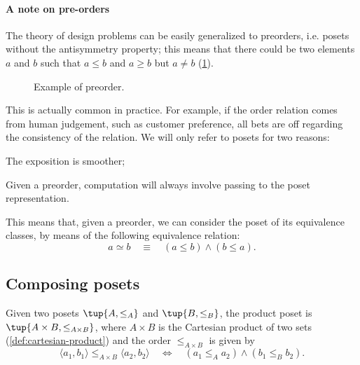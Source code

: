 \paragraph{A note on pre-orders}
The theory of design problems can be easily generalized to preorders, i.e. posets without the antisymmetry property; this means that there could be two elements $a$ and $b$ such that $a\leq b$ and $a \geq b$ but $a \neq b$ (\cref{fig:preorder}).

\begin{figure}[h!]
\begin{center}
\end{center}
\caption{Example of preorder. \label{fig:preorder}}
\end{figure}

This is actually common in practice. For example, if the order relation comes from human judgement, such as customer preference, all bets are off regarding the consistency of the relation. We will only refer to posets for two reasons:
\begin{compactenum}
        \item The exposition is smoother;
        \item Given a preorder, computation will always involve passing to the poset representation.
\end{compactenum}
This means that, given a preorder, we can consider the poset of its equivalence classes, by means of the following equivalence relation:
\begin{equation}
        a \simeq b \quad \equiv \quad (a \leq b) \wedge (b \leq a).
\end{equation}

\subsection{Composing posets}

\begin{definition}
Given two posets $\tup{A, \leq_A}$
and  $\tup{B, \leq_B}$, the product poset is $\tup{A \times B, \leq_{A\times B}}$, where $A \times B$ is the Cartesian product of two sets (\cref{def:cartesian-product}) and the order $\leq_{A\times B}$ is given by
\begin{equation}
        \langle a_1, b_1 \rangle
        \leq_{A\times B}
        \langle a_2, b_2 \rangle
        \quad
        \Leftrightarrow
        \quad
        ( a_1 \leq_A a_2) \wedge
        (b_1 \leq_B b_2).
    \end{equation}
\end{definition}

